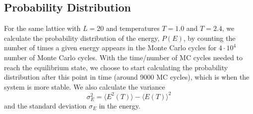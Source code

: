 \documentclass[12pt,a4paper,english]{article}
\begin{document}
\subsection{Probability Distribution}
\label{subsect:Prob_dist}
For the same lattice with $L=20$ and temperatures $T=1.0$ and $T=2.4$, we calculate the probability distribution of the energy, $P(E)$, by counting the number of times a given energy appears in the Monte Carlo cycles for $4\cdot10^4$ number of Monte Carlo cycles. With the time/number of MC cycles needed to reach the equilibrium state, we choose to start calculating the probability distribution after this point in time (around 9000 MC cycles), which is when the system is more stable. We also calculate the variance \[\sigma_E^2=\langle E^2(T)\rangle-\langle E(T)\rangle^2\] and the standard deviation $\sigma_E$ in the energy.
\end{document}
